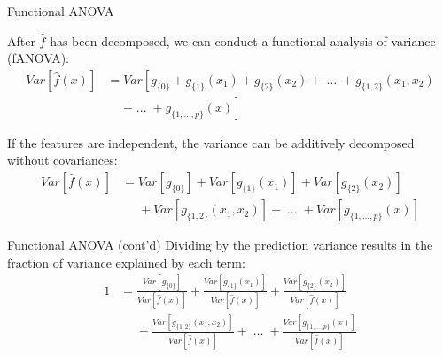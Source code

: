 \documentclass[aspectratio=169]{../latex_main/tntbeamer}  %
\newcommand{\predvar}{Var\left[\hat{f}(x)\right]}
\begin{document}
\begin{frame}[c]{Functional ANOVA}
	
	After $\hat{f}$ has been decomposed, we can conduct a functional analysis of variance (fANOVA):
		\begin{align*}
		Var\left[\hat{f}(x)\right] &= Var\left[g_{\{0\}} + g_{\{1\}}(x_1) + g_{\{2\}}(x_2) + \;\dots\; + g_{\{1, 2\}}(x_1, x_2) \right. \\
		&\phantom{{}={}} \left. + \;\dots\; + g_{\{1,\ldots,p\}}(x) \right]
		\end{align*}
		\pause
		
		If the features are independent, the variance can be additively decomposed without covariances:
		\begin{align*}
		Var\left[\hat{f}(x)\right] &= Var\left[g_{\{0\}}\right] + Var\left[g_{\{1\}}(x_1)\right] + Var\left[g_{\{2\}}(x_2)\right] \\
		&\phantom{{}={}} + Var\left[g_{\{1, 2\}}(x_1, x_2)\right] + \;\dots\; + Var\left[g_{\{1,\ldots,p\}}(x)\right]
		\end{align*}
\end{frame}
		
\begin{frame}[c]{Functional ANOVA (cont'd)}
		Dividing by the prediction variance results in the fraction of variance explained by each term:
		\begin{align*}
		1 &= \frac{Var\left[g_{\{0\}}\right]}{\predvar} + \frac{Var\left[g_{\{1\}}(x_1)\right]}{\predvar} + \frac{Var\left[g_{\{2\}}(x_2)\right]}{\predvar} \\
		&\phantom{{}={}} + \frac{Var\left[g_{\{1, 2\}}(x_1, x_2)\right]}{\predvar} + \;\dots\; + \frac{Var\left[g_{\{1,\ldots,p\}}(x)\right]}{\predvar}
		\end{align*}
		
	
\end{frame}
\end{document}
